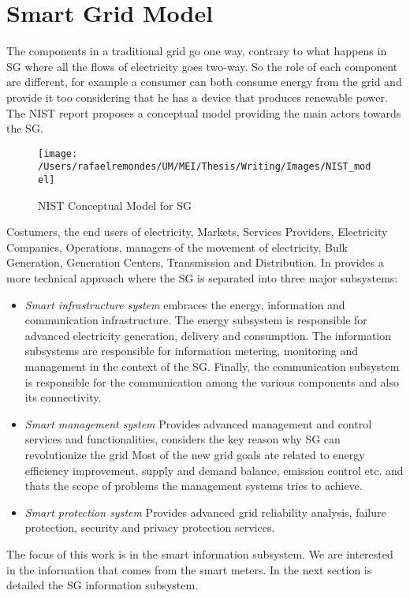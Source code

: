 \section{Smart Grid Model}
 The components in a traditional grid go one way, contrary to what happens in SG where all the flows of electricity goes two-way.  So the role of each component are different, for example a consumer can both consume energy from the grid and provide it too considering that he has a device that produces renewable power. The NIST report \cite{government2011nist} proposes a conceptual model providing the main actors towards the SG.
\begin{figure}[h]
\centering
\texttt{[image: /Users/rafaelremondes/UM/MEI/Thesis/Writing/Images/NIST\_model]}
\caption{\label{fig:NIST_model} NIST Conceptual Model for SG}
\end{figure}
Costumers, the end users of electricity, Markets, Services Providers, Electricity Companies, Operations, managers of the movement of electricity, Bulk Generation, Generation Centers, Transmission and Distribution. 
In \cite{journals/comsur/FangMXY12} provides a more technical approach where the SG is separated into three major subsystems:
\begin{itemize}
\item \textit{Smart infrastructure system} embraces the energy, information and communication infrastructure. The energy subsystem is responsible for advanced electricity generation, delivery and consumption. The information subsystems are responsible for information metering, monitoring and management in the context of the SG. Finally, the communication subsystem is responsible for the communication among the various components and also its connectivity.   
\item \textit{Smart management system} Provides advanced management and control services and functionalities, \cite{journals/comsur/FangMXY12} considers the key reason why SG can revolutionize the grid  
Most of the new grid goals ate related to energy efficiency improvement, supply and demand balance, emission control etc. and thats the scope of problems the management systems tries to achieve.
\item \textit{Smart protection system} Provides advanced grid reliability analysis, failure protection, security and privacy protection services.
 \end{itemize}
The focus of this work is in the smart information subsystem. We are interested in the information that comes from the smart meters. In the next section is detailed the SG information subsystem.
